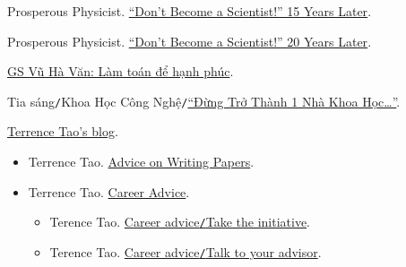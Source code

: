 \documentclass{article}
\numberwithin{equation}{section}
\begin{document}
\begin{thebibliography}{99}
	 Prosperous Physicist. \href{https://www.prosperousphysicist.com/dont-become-a-scientist-15-years-later/}{``Don't Become a Scientist!'' 15 Years Later}.
	
	 Prosperous Physicist. \href{http://www.prosperousphysicist.com/dont-become-a-scientist-20-years-later/}{``Don't Become a Scientist!'' 20 Years Later}.
	
	 \href{https://thanhnien.vn/gs-vu-ha-van-lam-toan-de-hanh-phuc-post15849.html}{GS Vũ Hà Văn: Làm toán để hạnh phúc}.
	
	 Tia sáng\texttt{/}Khoa Học Công Nghệ\texttt{/}\href{https://tiasang.com.vn/khoa-hoc-cong-nghe/dung-tro-thanh-mot-nha-khoa-hoc-903}{``Đừng Trở Thành 1 Nhà Khoa Học\ldots''}.
	
	 \href{https://terrytao.wordpress.com/}{Terrence Tao's blog}.
	\begin{itemize}
		\item Terrence Tao. \href{https://terrytao.wordpress.com/advice-on-writing-papers/}{Advice on Writing Papers}.
		\item Terrence Tao. \href{https://terrytao.wordpress.com/career-advice/}{Career Advice}.
		\begin{itemize}
			\item Terence Tao. \href{https://terrytao.wordpress.com/career-advice/take-the-initiative/}{Career advice\texttt{/}Take the initiative}.
			\item Terence Tao. \href{https://terrytao.wordpress.com/career-advice/talk-to-your-advisor/}{Career advice\texttt{/}Talk to your advisor}.
		\end{itemize}
	\end{itemize}
	

\end{thebibliography}
\end{document}
